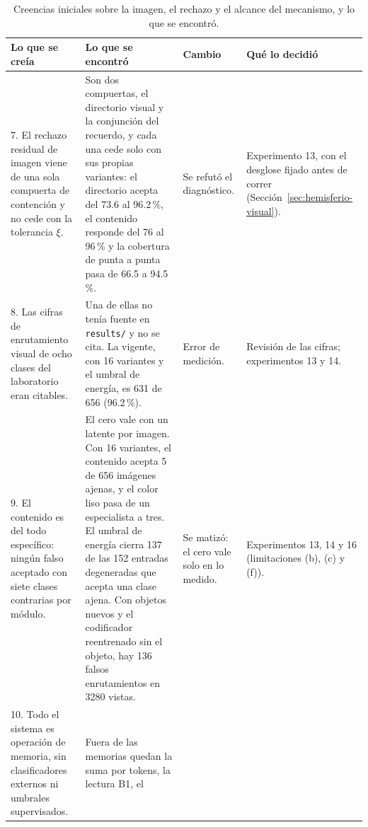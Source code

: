 \begin{table}[H]
    \centering
    \caption[Creencias iniciales: imagen, rechazo y alcance del mecanismo]{Creencias
    iniciales sobre la imagen, el rechazo y el alcance del mecanismo, y lo que se
    encontró.}
    \label{fase:tab-creencias-imagen}
    \footnotesize
    \setlength{\tabcolsep}{3pt}
    \begin{tabular}{p{}p{}p{}p{}}
        \toprule
        Lo que se creía & Lo que se encontró & Cambio & Qué lo decidió \\
        \midrule
        \raggedright 7. El rechazo residual de imagen viene de una sola compuerta de
        contención y no cede con la tolerancia $\xi$. &
        \raggedright Son dos compuertas, el directorio visual y la conjunción del
        recuerdo, y cada una cede solo con sus propias variantes: el directorio acepta
        del 73.6 al 96.2\,\%, el contenido responde del 76 al 96\,\% y la cobertura de
        punta a punta pasa de 66.5 a 94.5\,\%. &
        \raggedright Se refutó el diagnóstico. &
        \raggedright Experimento 13, con el desglose fijado antes de correr
        (Sección~\ref{sec:hemisferio-visual}). \tabularnewline\addlinespace[4pt]
        \raggedright 8. Las cifras de enrutamiento visual de ocho clases del laboratorio
        eran citables. &
        \raggedright Una de ellas no tenía fuente en \texttt{results/} y no se cita.
        La vigente, con 16 variantes y el umbral de energía, es
        631 de 656 (96.2\,\%). &
        \raggedright Error de medición. &
        \raggedright Revisión de las cifras; experimentos 13 y 14.
        \tabularnewline\addlinespace[4pt]
        \raggedright 9. El contenido es del todo específico: ningún falso aceptado con
        siete clases contrarias por módulo. &
        \raggedright El cero vale con un latente por imagen. Con 16 variantes, el
        contenido acepta 5 de 656 imágenes ajenas, y el color liso pasa de un
        especialista a tres. El umbral de energía cierra 137 de las 152 entradas
        degeneradas que acepta una clase ajena. Con objetos nuevos y el codificador
        reentrenado sin el objeto, hay 136 falsos enrutamientos en 3280 vistas. &
        \raggedright Se matizó: el cero vale solo en lo medido. &
        \raggedright Experimentos 13, 14 y 16 (limitaciones (b), (c) y (f)).
        \tabularnewline\addlinespace[4pt]
        \raggedright 10. Todo el sistema es operación de memoria, sin clasificadores
        externos ni umbrales supervisados. &
        \raggedright Fuera de las memorias quedan la suma por tokens, la lectura B1, el

\end{tabular}
\end{table}
